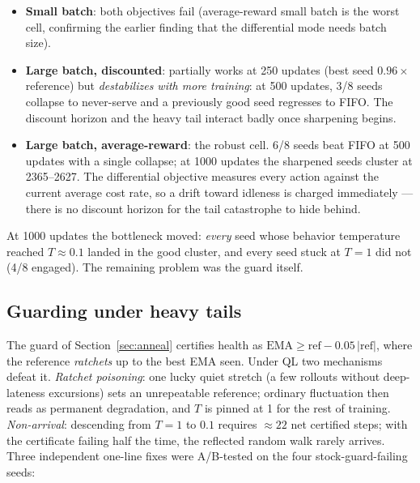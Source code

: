 \documentclass[11pt,a4paper]{article}
\begin{document}
\begin{itemize}
  \item \textbf{Small batch}: both objectives fail (average-reward small
  batch is the worst cell, confirming the earlier finding that the
  differential mode needs batch size).
  \item \textbf{Large batch, discounted}: partially works at 250 updates
  (best seed $0.96\times$ reference) but \emph{destabilizes with more
  training}: at 500 updates, 3/8 seeds collapse to never-serve and a
  previously good seed regresses to FIFO.  The discount horizon and the
  heavy tail interact badly once sharpening begins.
  \item \textbf{Large batch, average-reward}: the robust cell.  6/8
  seeds beat FIFO at 500 updates with a single collapse; at 1000 updates
  the sharpened seeds cluster at 2365--2627.  The differential objective
  measures every action against the current average cost rate, so a
  drift toward idleness is charged immediately --- there is no discount
  horizon for the tail catastrophe to hide behind.
\end{itemize}

At 1000 updates the bottleneck moved: \emph{every} seed whose behavior
temperature reached $T \approx 0.1$ landed in the good cluster, and every
seed stuck at $T = 1$ did not (4/8 engaged).  The remaining problem was
the guard itself.

\subsection{Guarding under heavy tails}
\label{sec:qlguard}

The guard of Section~\ref{sec:anneal} certifies health as
$\mathrm{EMA} \ge \mathrm{ref} - 0.05\,|\mathrm{ref}|$, where the
reference \emph{ratchets} up to the best EMA seen.  Under QL two
mechanisms defeat it.  \emph{Ratchet poisoning}: one lucky quiet stretch
(a few rollouts without deep-lateness excursions) sets an unrepeatable
reference; ordinary fluctuation then reads as permanent degradation, and
$T$ is pinned at 1 for the rest of training.  \emph{Non-arrival}:
descending from $T{=}1$ to $0.1$ requires $\approx 22$ net certified
steps; with the certificate failing half the time, the reflected random
walk rarely arrives.  Three independent one-line fixes were A/B-tested on
the four stock-guard-failing seeds:
\end{document}
